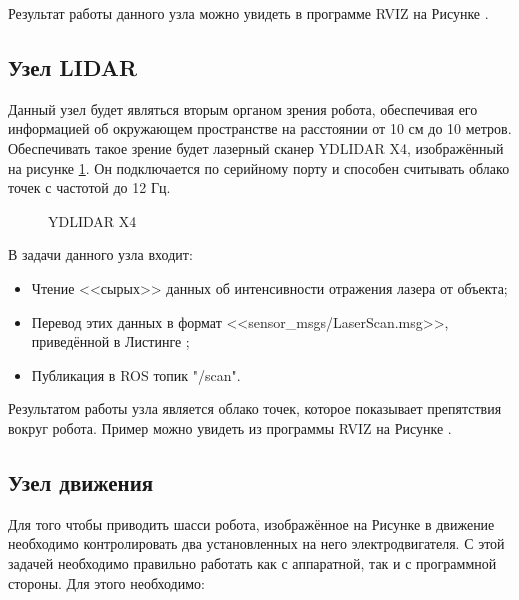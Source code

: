 \documentclass[12pt,a4paper]{scrartcl}
\begin{document}
				Результат работы данного узла можно увидеть в программе RVIZ на Рисунке .
				
			\subsection{Узел LIDAR} \label{sec:LiDAR}
				Данный узел будет являться вторым органом зрения робота, обеспечивая его информацией об окружающем пространстве на расстоянии от 10 см до 10 метров. Обеспечивать такое зрение будет лазерный сканер YDLIDAR X4, изображённый на рисунке \ref{fig:ydlidarx4}\cite{bib:ydlidarx4}. Он подключается по серийному порту и способен считывать облако точек с частотой до 12 Гц\cite{bib:ydlidarx4}. 
				
				\begin{figure}[h]
					\caption{YDLIDAR X4}
					\label{fig:ydlidarx4}
				\end{figure}
				
				В задачи данного узла входит:
				\begin{itemize}
					\item Чтение <<сырых>> данных об интенсивности отражения лазера от объекта;
					\item Перевод этих данных в формат <<sensor\_msgs/LaserScan.msg>>, приведённой в Листинге  ;
					\item Публикация в ROS топик "/scan".
				\end{itemize}
				
				Результатом работы узла является облако точек, которое показывает препятствия вокруг робота\cite{bib:lidarDescription}. Пример можно увидеть из программы RVIZ на Рисунке .
				
			\subsection{Узел движения} \label{sec:Movement}
				Для того чтобы приводить шасси робота, изображённое на Рисунке  в движение необходимо контролировать два установленных на него электродвигателя. С этой задачей необходимо правильно работать как с аппаратной, так и с программной стороны. Для этого необходимо:
				
\end{document}
